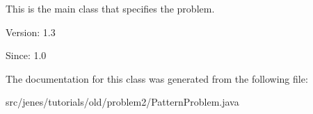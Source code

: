 This is the main class that specifies the problem.

\begin{Desc}
\item[Version:]1.3\end{Desc}
\begin{Desc}
\item[Since:]1.0 \end{Desc}


The documentation for this class was generated from the following file:\begin{CompactItemize}
\item 
src/jenes/tutorials/old/problem2/PatternProblem.java\end{CompactItemize}
